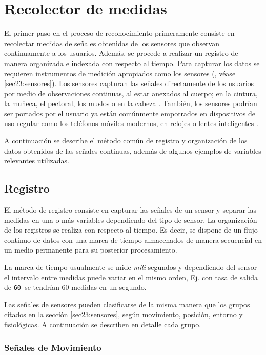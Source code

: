 \section{Recolector de medidas}

\label{sec43:recolector-datos}El primer paso en el proceso de reconocimiento
primeramente consiste en recolectar medidas de señales obtenidas de
los sensores que observan continuamente a los usuarios. Además, se
procede a realizar un registro de manera organizada e indexada con
respecto al tiempo. Para capturar los datos se requieren instrumentos
de medición apropiados como los sensores (, véase
\ref{sec23:sensores}). Los sensores capturan las señales directamente
de los usuarios por medio de observaciones continuas, al estar anexados
al cuerpo; en la cintura, la muñeca, el pectoral, los muslos o en
la cabeza \cite{Bao2004}. También, los sensores podrían ser portados
por el usuario ya están comúnmente empotrados en dispositivos de uso
regular como los teléfonos móviles modernos, en relojes o lentes inteligentes
\cite{LaraLabrador2012,Choudhury2008}.

A continuación se describe el método común de registro y organización
de los datos obtenidos de las señales continuas, además de algunos
ejemplos de variables relevantes utilizadas.

\subsection{Registro}

El método de registro consiste en capturar las señales de un sensor
y separar las medidas en una o más variables dependiendo del tipo
de sensor. La organización de los registros se realiza con respecto
al tiempo. Es decir, se dispone de un flujo continuo de datos con
una marca de tiempo almacenados de manera secuencial en un medio permanente
para su posterior procesamiento. 

La marca de tiempo usualmente se mide \emph{mili}-segundos y dependiendo
del sensor el intervalo entre medidas puede variar en el mismo orden,
Ej. con tasa de salida de \texttt{60  }se tendrían 60 medidas
en un segundo. 

Las señales de sensores pueden clasificarse de la misma manera que
los grupos citados en la sección \ref{sec23:sensores}, según movimiento,
posición, entorno y fisiológicas. A continuación se describen en detalle
cada grupo.

\subsubsection{Señales de Movimiento}

